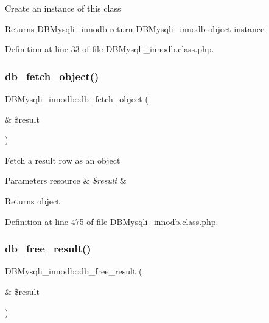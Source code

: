 Create an instance of this class \begin{DoxyReturn}{Returns}
\hyperlink{classDBMysqli__innodb}{D\+B\+Mysqli\+\_\+innodb} return \hyperlink{classDBMysqli__innodb}{D\+B\+Mysqli\+\_\+innodb} object instance 
\end{DoxyReturn}


Definition at line 33 of file D\+B\+Mysqli\+\_\+innodb.\+class.\+php.

\hypertarget{classDBMysqli__innodb_a676cdff9d50d9398c0c2e3f9d50e8c0a}{}\label{classDBMysqli__innodb_a676cdff9d50d9398c0c2e3f9d50e8c0a} 
\subsubsection{\texorpdfstring{db\+\_\+fetch\+\_\+object()}{db\_fetch\_object()}}
{\footnotesize\ttfamily D\+B\+Mysqli\+\_\+innodb\+::db\+\_\+fetch\+\_\+object (\begin{DoxyParamCaption}\item[{\&}]{\$result }\end{DoxyParamCaption})}

Fetch a result row as an object 
\begin{DoxyParams}[1]{Parameters}
resource & {\em \$result} & \\
\hline
\end{DoxyParams}
\begin{DoxyReturn}{Returns}
object 
\end{DoxyReturn}


Definition at line 475 of file D\+B\+Mysqli\+\_\+innodb.\+class.\+php.

\hypertarget{classDBMysqli__innodb_a0eb1700db91867677a8f7fa9e2f25298}{}\label{classDBMysqli__innodb_a0eb1700db91867677a8f7fa9e2f25298} 
\subsubsection{\texorpdfstring{db\+\_\+free\+\_\+result()}{db\_free\_result()}}
{\footnotesize\ttfamily D\+B\+Mysqli\+\_\+innodb\+::db\+\_\+free\+\_\+result (\begin{DoxyParamCaption}\item[{\&}]{\$result }\end{DoxyParamCaption})}

